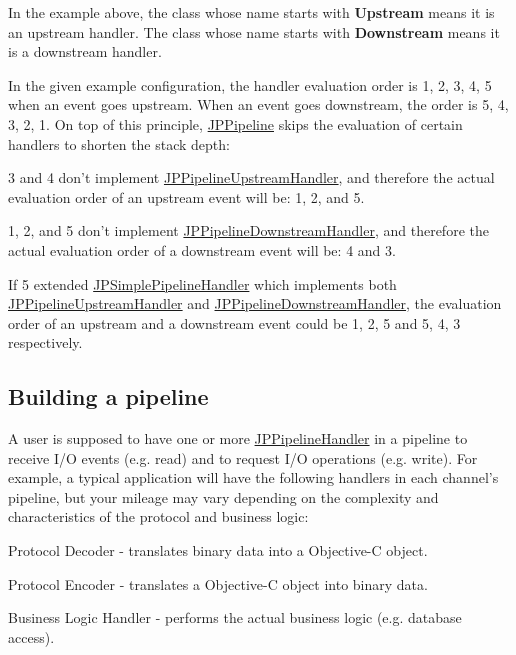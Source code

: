 In the example above, the class whose name starts with {\bfseries Upstream} means it is an upstream handler. The class whose name starts with {\bfseries Downstream} means it is a downstream handler. 

In the given example configuration, the handler evaluation order is 1, 2, 3, 4, 5 when an event goes upstream. When an event goes downstream, the order is 5, 4, 3, 2, 1. On top of this principle, \hyperlink{a00019}{JPPipeline} skips the evaluation of certain handlers to shorten the stack depth: 
\begin{DoxyItemize}
\item 3 and 4 don't implement \hyperlink{a00035}{JPPipelineUpstreamHandler}, and therefore the actual evaluation order of an upstream event will be: 1, 2, and 5. 
\item 1, 2, and 5 don't implement \hyperlink{a00021}{JPPipelineDownstreamHandler}, and therefore the actual evaluation order of a downstream event will be: 4 and 3. 
\item If 5 extended \hyperlink{a00038}{JPSimplePipelineHandler} which implements both \hyperlink{a00035}{JPPipelineUpstreamHandler} and \hyperlink{a00021}{JPPipelineDownstreamHandler}, the evaluation order of an upstream and a downstream event could be 1, 2, 5 and 5, 4, 3 respectively. 
\end{DoxyItemize}

\subsection*{Building a pipeline}

A user is supposed to have one or more \hyperlink{a00029}{JPPipelineHandler} in a pipeline to receive I/O events (e.g. read) and to request I/O operations (e.g. write). For example, a typical application will have the following handlers in each channel's pipeline, but your mileage may vary depending on the complexity and characteristics of the protocol and business logic:


\begin{DoxyEnumerate}
\item Protocol Decoder -\/ translates binary data into a Objective-\/C object. 
\item Protocol Encoder -\/ translates a Objective-\/C object into binary data. 
\item Business Logic Handler -\/ performs the actual business logic (e.g. database access). 
\end{DoxyEnumerate}

